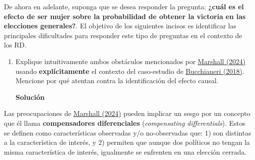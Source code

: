 \documentclass[a4paper, answers, addpoints, 11pt]{exam}
\newenvironment{solucion}{%
  \begin{mdframed}[
    backgroundcolor=blue!5,    %
    linecolor=blue!50,          %
    linewidth=2pt,              %
    leftmargin=10pt,            %
    rightmargin=8pt,           %
    topline=true,              %
    bottomline=true,            %
    roundcorner=10pt,           %
    innerleftmargin=10pt,       %
    innerrightmargin=10pt,      %
    innerbottommargin=10pt,     %
    innertopmargin=10pt         %
  ]%
  \begin{tcolorbox}[colframe=blue!50!black, colback=blue!50, coltitle=white, sharp corners=all, boxrule=1mm, width=\textwidth, halign=left, valign=center, top=0mm, bottom=0mm, left=0mm, right=0mm] \textbf{Solución} \end{tcolorbox} }{\end{mdframed}}
\begin{document}
De ahora en adelante, suponga que se desea responder la pregunta: \textbf{¿cuál es el efecto de ser mujer sobre la probabilidad de obtener la victoria en las elecciones generales?}. El objetivo de los siguientes incisos es identificar las principales dificultades para responder este tipo de preguntas en el contexto de los RD.

\bigskip

\begin{enumerate}[resume]
    
\item Explique intuitivamente ambos obstáculos mencionados por \href{https://onlinelibrary-wiley-com.ezproxy.uniandes.edu.co/doi/full/10.1111/ajps.12741}{Marshall (2024)} usando \textbf{explícitamente} el contexto del caso-estudio de \href{https://link.springer.com/article/10.1007/s11109-017-9407-7}{Bucchianeri (2018)}. Mencione por qué atentan contra la identificación del efecto causal. 

        \begin{solucion}
\end{solucion}
\end{enumerate}

\bigskip

Las preocupaciones de \href{https://onlinelibrary-wiley-com.ezproxy.uniandes.edu.co/doi/full/10.1111/ajps.12741}{Marshall (2024)} pueden implicar un sesgo por un concepto que él llama \textbf{compensadores diferenciales} (\textit{compensating differentials}). Estos se definen como características observadas y/o no-observadas que: 1) son distintas a la característica de interés, y 2) permiten que aunque dos políticos no tengan la misma característica de interés, igualmente se enfrenten en una elección cerrada. \\
\end{document}
